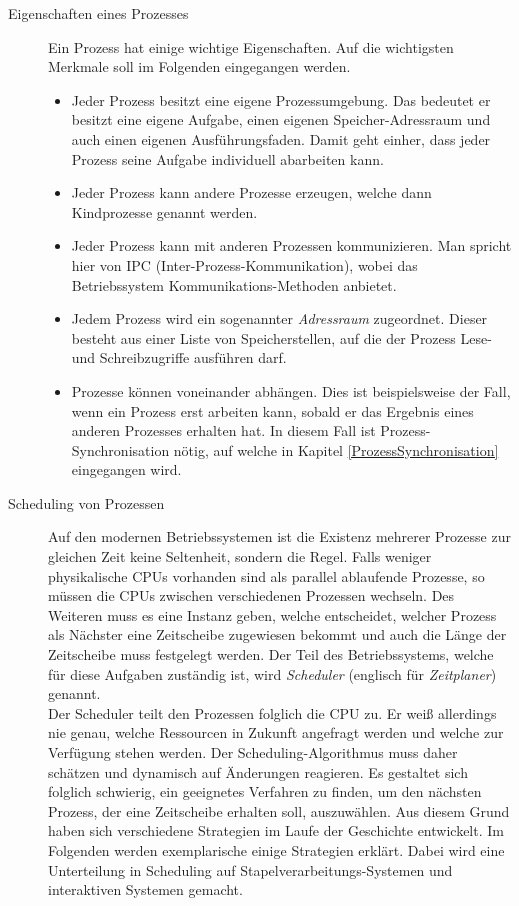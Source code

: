 \begin{description}
					\item[Eigenschaften eines Prozesses]
						
						Ein Prozess hat einige wichtige Eigenschaften. Auf die wichtigsten Merkmale soll im Folgenden eingegangen werden.
						
						\begin{itemize}
							\item Jeder Prozess besitzt eine eigene Prozessumgebung. Das bedeutet er besitzt eine eigene Aufgabe, einen eigenen Speicher-Adressraum und auch einen eigenen Ausführungsfaden. Damit geht einher, dass jeder Prozess seine Aufgabe individuell abarbeiten kann.
							\item Jeder Prozess kann andere Prozesse erzeugen, welche dann Kindprozesse genannt werden.
							\item Jeder Prozess kann mit anderen Prozessen kommunizieren. Man spricht hier von IPC (Inter-Prozess-Kommunikation), wobei das Betriebssystem Kommunikations-Methoden anbietet.
							\item Jedem Prozess wird ein sogenannter \textit{Adressraum} zugeordnet. Dieser besteht aus einer Liste von Speicherstellen, auf die der Prozess Lese- und Schreibzugriffe ausführen darf.
							\item Prozesse können voneinander abhängen. Dies ist beispielsweise der Fall, wenn ein Prozess erst arbeiten kann, sobald er das Ergebnis eines anderen Prozesses erhalten hat. In diesem Fall ist Prozess-Synchronisation nötig, auf welche in Kapitel \ref{ProzessSynchronisation} eingegangen wird. \cite{ModerneBetriebssysteme}
						\end{itemize}
						
					\item[Scheduling von Prozessen]
						\label{ProzessScheduling}
						
						Auf den modernen Betriebssystemen ist die Existenz mehrerer Prozesse zur gleichen Zeit keine Seltenheit, sondern die Regel. Falls weniger physikalische CPUs vorhanden sind als parallel ablaufende Prozesse, so müssen die CPUs zwischen verschiedenen Prozessen wechseln. Des Weiteren muss es eine Instanz geben, welche entscheidet, welcher Prozess als Nächster eine Zeitscheibe zugewiesen bekommt und auch die Länge der Zeitscheibe muss festgelegt werden. Der Teil des Betriebssystems, welche für diese Aufgaben zuständig ist, wird \textit{Scheduler} (englisch für \textit{Zeitplaner}) genannt.\\
						Der Scheduler teilt den Prozessen folglich die CPU zu. Er weiß allerdings nie genau, welche Ressourcen in Zukunft angefragt werden und welche zur Verfügung stehen werden. Der Scheduling-Algorithmus muss daher schätzen und dynamisch auf Änderungen reagieren. Es gestaltet sich folglich schwierig, ein geeignetes Verfahren zu finden, um den nächsten Prozess, der eine Zeitscheibe erhalten soll, auszuwählen. Aus diesem Grund haben sich verschiedene Strategien im Laufe der Geschichte entwickelt. Im Folgenden werden exemplarische einige Strategien erklärt. Dabei wird eine Unterteilung in Scheduling auf Stapelverarbeitungs-Systemen und interaktiven Systemen gemacht.
						

\end{description}
